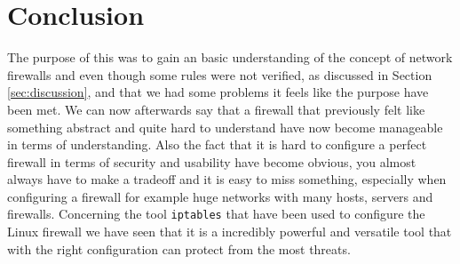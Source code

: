 \section{Conclusion} 
\label{sec:conclusion}
The purpose of this \lab{} was to gain an basic understanding of the concept of network firewalls and even though some rules were not verified, as discussed in Section \ref{sec:discussion}, and that we had some problems it feels like the purpose have been met. We can now afterwards say that a firewall that previously felt like something abstract and quite hard to understand have now become manageable in terms of understanding. Also the fact that it is hard to configure a perfect firewall in terms of security and usability have become obvious, you almost always have to make a tradeoff and it is easy to miss something, especially when configuring a firewall for example huge networks with many hosts, servers and firewalls. Concerning the tool \texttt{iptables} that have been used to configure the Linux firewall we have seen that it is a incredibly powerful and versatile tool that with the right configuration can protect from the most threats. 
